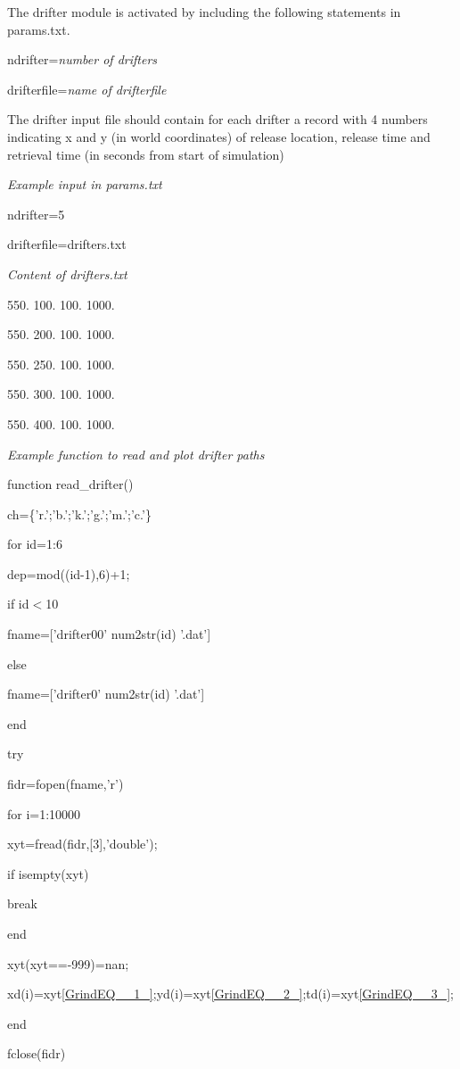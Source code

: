 The drifter  module is activated by including the following statements in params.txt. 

ndrifter=\textit{number of drifters}

drifterfile=\textit{name of drifterfile}

\textit{}

The drifter input file should contain for each drifter a record with 4 numbers indicating x and y (in world coordinates) of release location, release time and retrieval time (in seconds from start of simulation)

\textit{}

\textit{Example input in params.txt}

ndrifter=5

drifterfile=drifters.txt

\textit{Content of drifters.txt}

550. 100.  100. 1000.

550. 200.  100. 1000.

550. 250.  100. 1000.

550. 300.  100. 1000.

550. 400.  100. 1000.

\textit{Example function to read and plot drifter paths}

\textit{}

function read\_drifter()

ch=\{'r.';'b.';'k.';'g.';'m.';'c.'\}

for id=1:6

dep=mod((id-1),6)+1;    

if id$<$10

fname=['drifter00' num2str(id) '.dat']

else

fname=['drifter0' num2str(id) '.dat']

end

try

fidr=fopen(fname,'r')

for i=1:10000

xyt=fread(fidr,[3],'double');

if isempty(xyt)

break

end

xyt(xyt==-999)=nan;

xd(i)=xyt\eqref{GrindEQ__1_};yd(i)=xyt\eqref{GrindEQ__2_};td(i)=xyt\eqref{GrindEQ__3_};

end

fclose(fidr)

